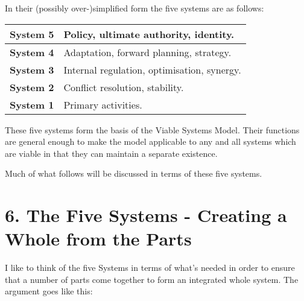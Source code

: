 {\renewcommand{\arraystretch}{1.5} %
}

In their (possibly over-)simplified form the five systems are as follows:

{\renewcommand{\arraystretch}{1.5} %
	\begin{tabular}{ | p{} | p{} | }
		\hline
		\textbf{System 5} & Policy, ultimate authority, identity. \\
		\hline
		\textbf{System 4} & Adaptation, forward planning, strategy. \\
		\hline
		\textbf{System 3} & Internal regulation, optimisation, synergy.  \\
		\hline
		\textbf{System 2} & Conflict resolution, stability. \\
		\hline
		\textbf{System 1} & Primary activities. \\
		\hline
	\end{tabular}
}

These five systems form the basis of the Viable Systems Model. Their functions are general enough to make the model applicable to any and all systems which are viable in that they can maintain a separate existence.

Much of what follows will be discussed in terms of these five systems.

\section*{6. The Five Systems - Creating a Whole from the Parts}
I like to think of the five Systems in terms of what's needed in order to ensure that a number of parts come together to form an integrated whole system. The argument goes like this:


